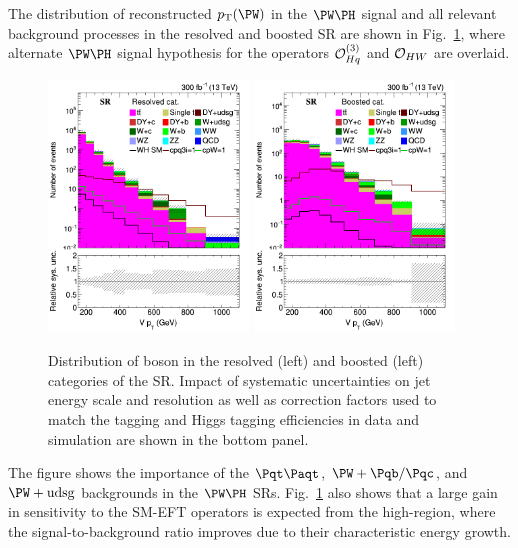 \documentclass[a4paper,11pt]{article}
\newcommand{\Pb}{{{\Pqb}}\xspace}
\newcommand{\Pt}{{{\Pqt}}\xspace}
\newcommand{\Pc}{{{\Pqc}}\xspace}
\newcommand{\PAt}{{{{\Paqt}}}\xspace}
\begin{document}
The distribution of reconstructed $\pt(\PW)$ in the $\PW\PH$ signal and all relevant background processes in the resolved and boosted SR are shown in Fig.~\ref{fig:RECO_Vpt_WH}, where alternate $\PW\PH$ signal hypothesis for the operators ${\cal O}^{(3)}_{Hq}$ and ${\cal O}_{HW}$  are overlaid. 
\begin{figure}[hbtp]
\begin{center}
\includegraphics[width=0.475\textwidth]{Figures/New/RECO/Plot_Resolved_SR_V_pt_WH.png}
\includegraphics[width=0.475\textwidth]{Figures/New/RECO/Plot_Boosted_SR_V_pt_WH.png}
\end{center}
\caption{
Distribution of \PW boson \pt in the resolved (left) and boosted (left) categories of the SR. Impact of systematic uncertainties on jet energy scale and resolution as well as correction factors used to match the \Pb tagging and Higgs tagging efficiencies in data and simulation are shown in the bottom panel.
}
\label{fig:RECO_Vpt_WH}
\end{figure}
The figure shows the importance of the $\Pt\PAt$, ${\PW}+\Pb/\Pc$, and ${\PW}+\textrm{udsg}$ backgrounds in the  $\PW\PH$ SRs.
Fig.~\ref{fig:RECO_Vpt_WH} also shows that a large gain in sensitivity to the SM-EFT operators is expected from the high-\pt region, where the signal-to-background ratio improves due to their characteristic energy growth.
\end{document}
